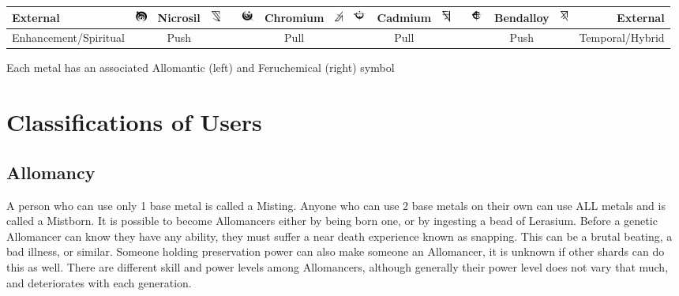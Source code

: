 \documentclass[conference]{IEEEtran}
\begin{document}
\begin{table}[!hb]
\begin{tabular}{ |l |ccc c ccc | ccc c ccc | r| }
		External&\includegraphics[height=1em]{images/Nicrosil.png} &Nicrosil& \includegraphics[height=1em]{images/Nicrosil_(Feruchemy).png}&&\includegraphics[height=1em]{images/Chromium.png}& Chromium& \includegraphics[height=1em]{images/Chromium_(Feruchemy).png}&\includegraphics[height=1em]{images/Cadmium.png} &Cadmium& \includegraphics[height=1em]{images/Cadmium_(Feruchemy).png}&&\includegraphics[height=1em]{images/Bendalloy.png}& Bendalloy& \includegraphics[height=1em]{images/Bendalloy_(Feruchemy).png}&External\\\hline
		Enhancement/Spiritual&&Push&&&&Pull&&&Pull&&&&Push&&Temporal/Hybrid\\\hline
	\end{tabular}
\vspace{0.5em}\break
Each metal has an associated Allomantic\cite{AL-TB} (left) and Feruchemical\cite{FE-TB} (right) symbol
	\label{metals}
\end{table}
\hfill
\section*{Classifications of Users}

\subsection*{Allomancy}
A person who can use only 1 base metal is called a Misting.\cite{TFE-CH3}  Anyone who can use 2 base metals on their own can use ALL metals and is called a Mistborn.  It is possible to become Allomancers either by being born one,\cite{TFE-CH3} or by ingesting a bead of Lerasium.\cite{WoA-CH59}  Before a genetic Allomancer can know they have any ability, they must suffer a near death experience known as snapping.\cite{TFE-CH17}  This can be a brutal beating, a bad illness, or similar.  Someone holding preservation power can also make someone an Allomancer,\cite{HoA-EP} it is unknown if other shards can do this as well.  There are different skill and power levels among Allomancers,\cite{WoA-CH54}\cite{WoF}\cite{TFE-CH38}\cite{TFE-CH31} although generally their power level does not vary that much, and deteriorates with each generation.\cite{AoL}\cite{WoF}  
\end{document}
